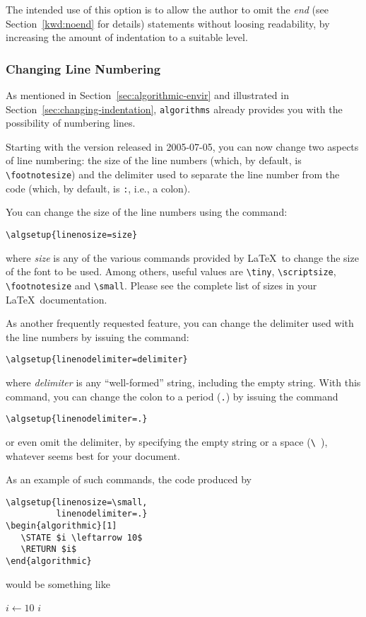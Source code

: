\documentclass{article}
\newcommand{\keyword}[1]{\texttt{#1}}
\begin{document}
The intended use of this option is to allow the author to omit the
\emph{end} (see Section~\ref{kwd:noend} for details) statements without
loosing readability, by increasing the amount of indentation to a suitable
level.

\subsubsection{Changing Line Numbering}

As mentioned in Section~\ref{sec:algorithmic-envir} and illustrated in
Section~\ref{sec:changing-indentation}, \keyword{algorithms} already
provides you with the possibility of numbering lines.

Starting with the version released in 2005-07-05, you can now change two
aspects of line numbering: the size of the line numbers (which, by default,
is \verb+\footnotesize+) and the delimiter used to separate the line number
from the code (which, by default, is \verb+:+, i.e., a colon).

You can change the size of the line numbers using the command:
\begin{verbatim}
\algsetup{linenosize=size}
\end{verbatim}
where \emph{size} is any of the various commands provided by \LaTeX\ to
change the size of the font to be used. Among others, useful values are
\verb+\tiny+, \verb+\scriptsize+, \verb+\footnotesize+ and \verb+\small+.
Please see the complete list of sizes in your \LaTeX\ documentation.

As another frequently requested feature, you can change the delimiter used
with the line numbers by issuing the command:
\begin{verbatim}
\algsetup{linenodelimiter=delimiter}
\end{verbatim}
where \emph{delimiter} is any ``well-formed'' string, including the empty
string. With this command, you can change the colon to a period (\verb+.+)
by issuing the command
\begin{verbatim}
\algsetup{linenodelimiter=.}
\end{verbatim}
or even omit the delimiter, by specifying the empty string or a space
(\verb+\ +), whatever seems best for your document.

As an example of such commands, the code produced by
\begin{verbatim}
\algsetup{linenosize=\small,
          linenodelimiter=.}
\begin{algorithmic}[1]
   \STATE $i \leftarrow 10$
   \RETURN $i$
\end{algorithmic}
\end{verbatim}
would be something like
\begin{algorithmic}[1]
   \STATE $i \leftarrow 10$
   \RETURN $i$
\end{algorithmic}
\end{document}
